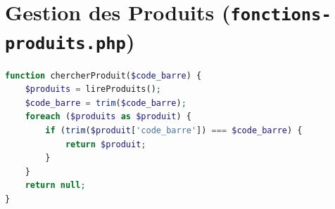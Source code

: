 \documentclass[12pt,a4paper]{report}
\begin{document}
\section{Gestion des Produits (\texttt{fonctions-produits.php})}
\begin{lstlisting}[language=PHP]
function chercherProduit($code_barre) {
    $produits = lireProduits();
    $code_barre = trim($code_barre);
    foreach ($produits as $produit) {
        if (trim($produit['code_barre']) === $code_barre) {
            return $produit;
        }
    }
    return null;
}
\end{lstlisting}
\end{document}
